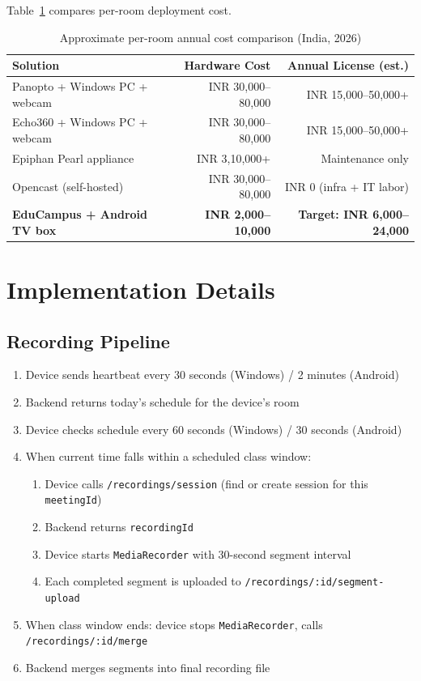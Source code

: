 \documentclass[12pt,a4paper]{article}
\begin{document}
\bigskip
Table~\ref{tab:cost} compares per-room deployment cost.

\begin{table}[H]
\centering
\caption{Approximate per-room annual cost comparison (India, 2026)}
\label{tab:cost}
\begin{tabular}{lrr}
\toprule
\textbf{Solution} & \textbf{Hardware Cost} & \textbf{Annual License (est.)} \\
\midrule
Panopto + Windows PC + webcam & INR 30{,}000--80{,}000 & INR 15{,}000--50{,}000+ \\
Echo360 + Windows PC + webcam & INR 30{,}000--80{,}000 & INR 15{,}000--50{,}000+ \\
Epiphan Pearl appliance       & INR 3{,}10{,}000+       & Maintenance only \\
Opencast (self-hosted)        & INR 30{,}000--80{,}000 & INR 0 (infra + IT labor) \\
\textbf{EduCampus + Android TV box} & \textbf{INR 2{,}000--10{,}000} & \textbf{Target: INR 6{,}000--24{,}000} \\
\bottomrule
\end{tabular}
\end{table}

\section{Implementation Details}

\subsection{Recording Pipeline}

\begin{enumerate}
    \item Device sends heartbeat every 30 seconds (Windows) / 2 minutes (Android)
    \item Backend returns today's schedule for the device's room
    \item Device checks schedule every 60 seconds (Windows) / 30 seconds (Android)
    \item When current time falls within a scheduled class window:
    \begin{enumerate}
        \item Device calls \texttt{/recordings/session} (find or create session for this \texttt{meetingId})
        \item Backend returns \texttt{recordingId}
        \item Device starts \texttt{MediaRecorder} with 30-second segment interval
        \item Each completed segment is uploaded to \texttt{/recordings/:id/segment-upload}
    \end{enumerate}
    \item When class window ends: device stops \texttt{MediaRecorder}, calls \texttt{/recordings/:id/merge}
    \item Backend merges segments into final recording file
\end{enumerate}
\end{document}
